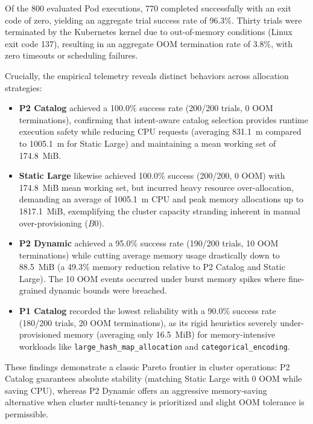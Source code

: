 Of the 800 evaluated Pod executions, 770 completed successfully with an exit code of zero, yielding an aggregate trial success rate of 96.3\%. Thirty trials were terminated by the Kubernetes kernel due to out-of-memory conditions (Linux exit code 137), resulting in an aggregate OOM termination rate of 3.8\%, with zero timeouts or scheduling failures.

Crucially, the empirical telemetry reveals distinct behaviors across allocation strategies:
\begin{itemize}
    \item \textbf{P2 Catalog} achieved a 100.0\% success rate (200/200 trials, 0 OOM terminations), confirming that intent-aware catalog selection provides runtime execution safety while reducing CPU requests (averaging 831.1~m compared to 1005.1~m for Static Large) and maintaining a mean working set of 174.8~MiB.
    \item \textbf{Static Large} likewise achieved 100.0\% success (200/200, 0 OOM) with 174.8~MiB mean working set, but incurred heavy resource over-allocation, demanding an average of 1005.1~m CPU and peak memory allocations up to 1817.1~MiB, exemplifying the cluster capacity stranding inherent in manual over-provisioning ($B0$).
    \item \textbf{P2 Dynamic} achieved a 95.0\% success rate (190/200 trials, 10 OOM terminations) while cutting average memory usage drastically down to 88.5~MiB (a 49.3\% memory reduction relative to P2 Catalog and Static Large). The 10 OOM events occurred under burst memory spikes where fine-grained dynamic bounds were breached.
    \item \textbf{P1 Catalog} recorded the lowest reliability with a 90.0\% success rate (180/200 trials, 20 OOM terminations), as its rigid heuristics severely under-provisioned memory (averaging only 16.5~MiB) for memory-intensive workloads like \texttt{large\_hash\_map\_allocation} and \texttt{categorical\_encoding}.
\end{itemize}

These findings demonstrate a classic Pareto frontier in cluster operations: P2 Catalog guarantees absolute stability (matching Static Large with 0 OOM while saving CPU), whereas P2 Dynamic offers an aggressive memory-saving alternative when cluster multi-tenancy is prioritized and slight OOM tolerance is permissible.

